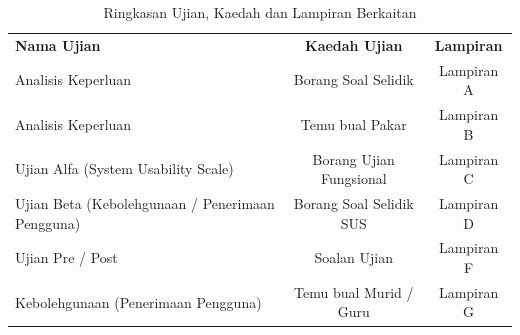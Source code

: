 \begin{table}[h]
\centering
\caption{Ringkasan Ujian, Kaedah dan Lampiran Berkaitan}
\label{jadual:ringkasan_ujian}
\begin{tabular}{>{\centering\arraybackslash}p{6cm}cc}
\toprule
\textbf{Nama Ujian} & \textbf{Kaedah Ujian} & \textbf{Lampiran} \\
 Analisis Keperluan & Borang Soal Selidik &Lampiran A \\ \midrule
Analisis Keperluan & Temu bual Pakar & Lampiran B\\ 
Ujian Alfa (System Usability Scale) & Borang  Ujian Fungsional& Lampiran C \\ 
Ujian Beta (Kebolehgunaan / Penerimaan Pengguna) & Borang Soal Selidik SUS & Lampiran D \\ 
Ujian Pre / Post & Soalan Ujian & Lampiran F \\ 
Kebolehgunaan (Penerimaan Pengguna) & Temu bual Murid / Guru & Lampiran G \\ \bottomrule
\end{tabular}
\end{table}
\clearpage


